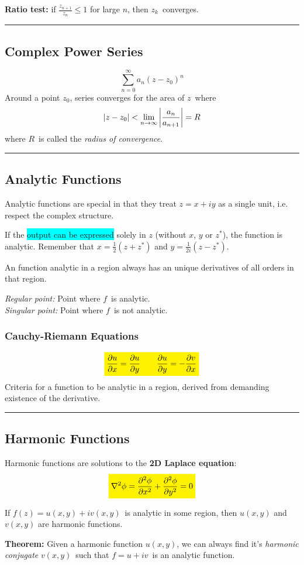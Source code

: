 \documentclass[10pt,a4paper]{article}
\newcommand{\holine}[1][\medskipamount]{\par\vspace*{\dimexpr-\parskip-\baselineskip+#1}\noindent\rule{\linewidth}{1pt}\par\vspace*{\dimexpr-\parskip-.5\baselineskip+#1}}
\newcommand{\half}{\frac{1}{2}}
\newcommand{\yl}[1]{\colorbox{yellow}{$\displaystyle #1$}}
\newcommand{\bll}{\colorbox{cyan}}
\begin{document}
\begin{multicols}{2}
\textbf{Ratio test:}
if $\frac{z_{n+1}}{z_n} \leq 1$ for large $n$, then $z_k$ converges.


\holine
\subsection*{Complex Power Series}
\[
    \sum_{n=0}^\infty a_n(z-z_0)^n
\]
Around a point $z_0$, series converges for the area of $z$ where
\[
    |z-z_0| < \lim_{n\rightarrow\infty} \qty|\frac{a_n}{a_{n+1}}| = R
\]
where $R$ is called the \textit{radius of convergence}.


\holine
\subsection*{Analytic Functions}
Analytic functions are special in that they treat $z=x+iy$ as a single unit, i.e. respect the complex structure.

If the \bll{output can be expressed} solely in $z$ (without $x$, $y$ or $z^*$), the function is analytic. Remember that $x = \half (z+z^*)$ and $y=\frac{1}{2i}(z-z^*)$.

An function analytic in a region always has an unique derivatives of all orders in that region.


\textit{Regular point:} Point where $f$ is analytic.\\
\textit{Singular point:} Point where $f$ is not analytic.


\subsubsection*{Cauchy-Riemann Equations}
\[\yl{
    \pdv{u}{x} = \pdv{u}{y} \quad\quad \pdv{u}{y} = - \pdv{v}{x}
}\]
Criteria for a function to be analytic in a region, derived from demanding existence of the derivative.



\holine
\subsection*{Harmonic Functions}
Harmonic functions are solutions to the \textbf{2D Laplace equation}:
\[\yl{
    \nabla^2 \phi = \pdv[2]{\phi}{x} + \pdv[2]{\phi}{y} = 0
}\]

If $f(z) = u(x,y) + iv(x,y)$ is analytic in some region, then $u(x,y)$ and $v(x,y)$ are harmonic functions.

\textbf{Theorem:} Given a harmonic function $u(x,y)$, we can always find it's \textit{harmonic conjugate} $v(x,y)$ such that $f = u + iv$ is an analytic function.



\end{multicols}
\end{document}

